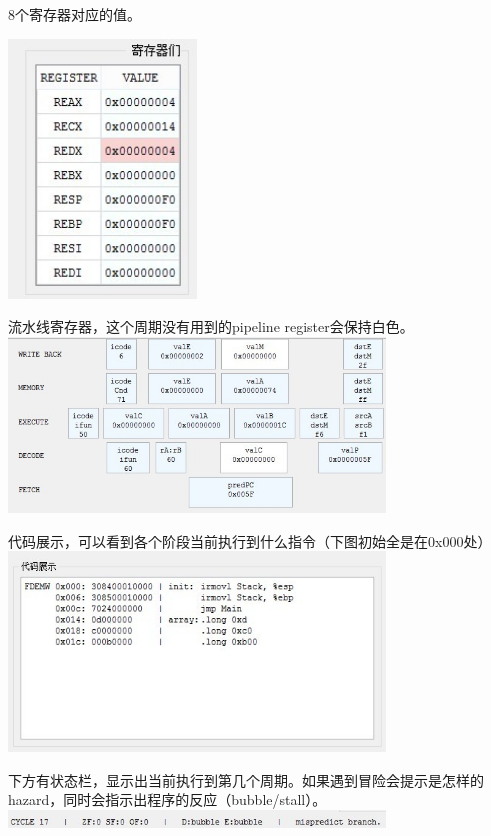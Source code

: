 \documentclass{article}
\begin{document}
\begin{center}
8个寄存器对应的值。

\includegraphics[width = 5cm]{4.jpg}
\end{center}
\begin{center}
流水线寄存器，这个周期没有用到的pipeline register会保持白色。
\includegraphics[width = 10cm]{5.jpg}
\end{center}

\begin{center}
代码展示，可以看到各个阶段当前执行到什么指令（下图初始全是在0x000处）
\includegraphics[width = 10cm]{6.jpg}
\end{center}

\begin{center}
下方有状态栏，显示出当前执行到第几个周期。如果遇到冒险会提示是怎样的hazard，同时会指示出程序的反应（bubble/stall）。
\includegraphics[width = 10cm]{7.jpg}
\end{center}
\end{document}
